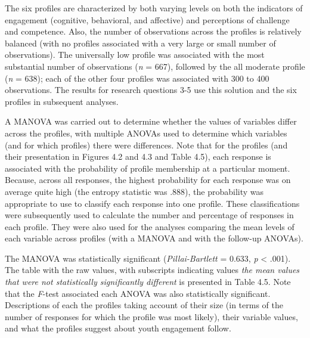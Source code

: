 \documentclass[]{msu-thesis}
\theoremstyle{definition}
\theoremstyle{definition}
\theoremstyle{definition}
\theoremstyle{remark}
\begin{document}
The six profiles are characterized by both varying levels on both the
indicators of engagement (cognitive, behavioral, and affective) and
perceptions of challenge and competence. Also, the number of
observations across the profiles is relatively balanced (with no
profiles associated with a very large or small number of observations).
The universally low profile was associated with the most substantial
number of observations (\emph{n} = 667), followed by the all moderate
profile (\emph{n} = 638); each of the other four profiles was associated
with 300 to 400 observations. The results for research questions 3-5 use
this solution and the six profiles in subsequent analyses.

A MANOVA was carried out to determine whether the values of variables
differ across the profiles, with multiple ANOVAs used to determine which
variables (and for which profiles) there were differences. Note that for
the profiles (and their presentation in Figures 4.2 and 4.3 and Table
4.5), each response is associated with the probability of profile
membership at a particular moment. Because, across all responses, the
highest probability for each response was on average quite high (the
entropy statistic was .888), the probability was appropriate to use to
classify each response into one profile. These classifications were
subsequently used to calculate the number and percentage of responses in
each profile. They were also used for the analyses comparing the mean
levels of each variable across profiles (with a MANOVA and with the
follow-up ANOVAs).

The MANOVA was statistically significant (\emph{Pillai-Bartlett} =
0.633, \emph{p} \textless{} .001). The table with the raw values, with
subscripts indicating values \emph{the mean values that were not
statistically significantly different} is presented in Table 4.5. Note
that the \emph{F}-test associated each ANOVA was also statistically
significant. Descriptions of each the profiles taking account of their
size (in terms of the number of responses for which the profile was most
likely), their variable values, and what the profiles suggest about
youth engagement follow.
\end{document}
